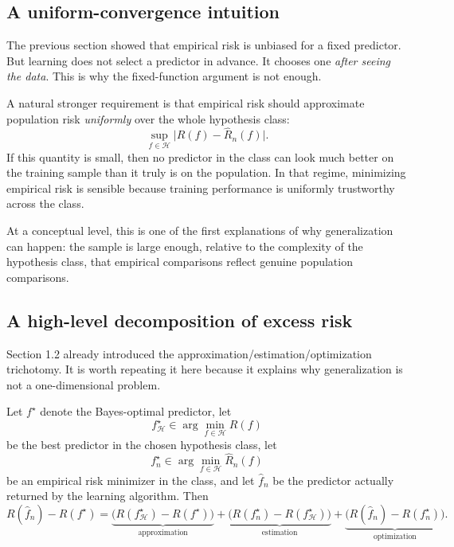 \subsection*{A uniform-convergence intuition}

The previous section showed that empirical risk is unbiased for a fixed predictor. But learning does not select a predictor in advance. It chooses one \emph{after seeing the data}. This is why the fixed-function argument is not enough.

A natural stronger requirement is that empirical risk should approximate population risk \emph{uniformly} over the whole hypothesis class:
\[
\sup_{f\in\mathcal H}\big|R(f)-\widehat R_n(f)\big|.
\]
If this quantity is small, then no predictor in the class can look much better on the training sample than it truly is on the population. In that regime, minimizing empirical risk is sensible because training performance is uniformly trustworthy across the class.

At a conceptual level, this is one of the first explanations of why generalization can happen:
the sample is large enough, relative to the complexity of the hypothesis class, that empirical comparisons reflect genuine population comparisons.

\subsection*{A high-level decomposition of excess risk}

Section 1.2 already introduced the approximation/estimation/optimization trichotomy. It is worth repeating it here because it explains why generalization is not a one-dimensional problem.

\begin{proposition}
Let $f^\star$ denote the Bayes-optimal predictor, let
\[
f_{\mathcal H}^\star \in \arg\min_{f\in\mathcal H} R(f)
\]
be the best predictor in the chosen hypothesis class, let
\[
f_n^\star \in \arg\min_{f\in\mathcal H} \widehat R_n(f)
\]
be an empirical risk minimizer in the class, and let $\hat f_n$ be the predictor actually returned by the learning algorithm. Then
\[
R(\hat f_n)-R(f^\star)
=
\underbrace{\bigl(R(f_{\mathcal H}^\star)-R(f^\star)\bigr)}_{\text{approximation}}
+
\underbrace{\bigl(R(f_n^\star)-R(f_{\mathcal H}^\star)\bigr)}_{\text{estimation}}
+
\underbrace{\bigl(R(\hat f_n)-R(f_n^\star)\bigr)}_{\text{optimization}}.
\]
\end{proposition}

